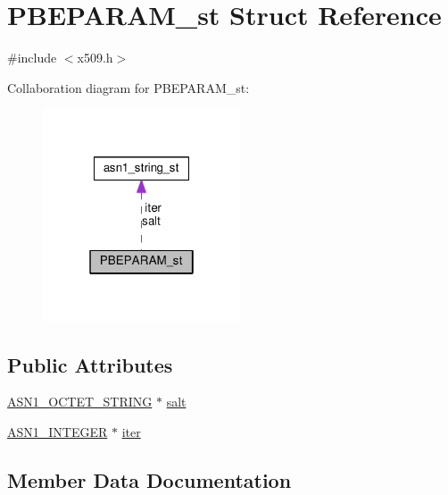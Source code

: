 \hypertarget{struct_p_b_e_p_a_r_a_m__st}{}\section{P\+B\+E\+P\+A\+R\+A\+M\+\_\+st Struct Reference}
\label{struct_p_b_e_p_a_r_a_m__st}


{\ttfamily \#include $<$x509.\+h$>$}



Collaboration diagram for P\+B\+E\+P\+A\+R\+A\+M\+\_\+st\+:
\nopagebreak
\begin{figure}[H]
\begin{center}
\leavevmode
\includegraphics[width=166pt]{struct_p_b_e_p_a_r_a_m__st__coll__graph}
\end{center}
\end{figure}
\subsection*{Public Attributes}
\begin{DoxyCompactItemize}
\item 
\hyperlink{ossl__typ_8h_afbd05e94e0f0430a2b729473efec88c1}{A\+S\+N1\+\_\+\+O\+C\+T\+E\+T\+\_\+\+S\+T\+R\+I\+NG} $\ast$ \hyperlink{struct_p_b_e_p_a_r_a_m__st_ab7fbc3e560ddba64320f0fe268d6caec}{salt}
\item 
\hyperlink{ossl__typ_8h_af4335399bf9774cb410a5e93de65998b}{A\+S\+N1\+\_\+\+I\+N\+T\+E\+G\+ER} $\ast$ \hyperlink{struct_p_b_e_p_a_r_a_m__st_a4f47729d79e3dd79bf1ccef09157cd1d}{iter}
\end{DoxyCompactItemize}


\subsection{Member Data Documentation}
